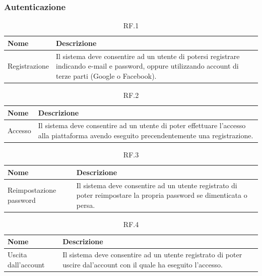 \documentclass{natourDoc}
\begin{document}
\subsubsection{Autenticazione}
\begin{table}[H]
	\centering
	\begin{tabular}{ |p{5cm}|p{10.3cm}| }
		\hline
		\rowcolor{PineGreen!70}
		\textbf{Nome} & \textbf{Descrizione}                                                                                                                                      \\
		\hline
		Registrazione & Il sistema deve consentire ad un utente di potersi registrare indicando e-mail e password, oppure utilizzando account di terze parti (Google o Facebook). \\
		\hline
	\end{tabular}
	\caption{RF.1}
\end{table}

\begin{table}[H]
	\centering
	\begin{tabular}{ |p{5cm}|p{10.3cm}| }
		\hline
		\rowcolor{PineGreen!70}
		\textbf{Nome} & \textbf{Descrizione}                                                                                                                       \\
		\hline
		Accesso       & Il sistema deve consentire ad un utente di poter effettuare l'accesso alla piattaforma avendo eseguito precendentemente una registrazione. \\
		\hline
	\end{tabular}
	\caption{RF.2}

\end{table}

\begin{table}[H]
	\centering
	\begin{tabular}{ |p{5cm}|p{10.3cm}| }
		\hline
		\rowcolor{PineGreen!70}
		\textbf{Nome}           & \textbf{Descrizione}                                                                                                \\
		\hline
		Reimpostazione password & Il sistema deve consentire ad un utente registrato di poter reimpostare la propria password se dimenticata o persa. \\
		\hline
	\end{tabular}
	\caption{RF.3}

\end{table}

\begin{table}[H]
	\centering
	\begin{tabular}{ |p{5cm}|p{10.3cm}| }
		\hline
		\rowcolor{PineGreen!70}
		\textbf{Nome}       & \textbf{Descrizione}                                                                                               \\
		\hline
		Uscita dall'account & Il sistema deve consentire ad un utente registrato di poter uscire dal'account con il quale ha eseguito l'accesso. \\
		\hline
	\end{tabular}
	\caption{RF.4}

\end{table}
\end{document}

